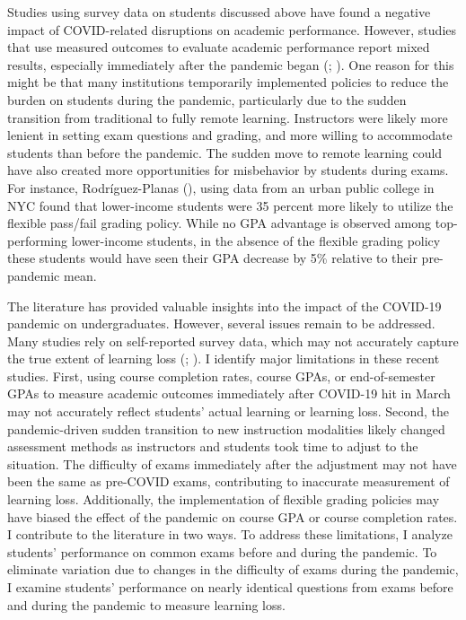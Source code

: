 \documentclass[
  12pt,
  letterpaper,
  DIV=11,
  numbers=noendperiod]{scrartcl}
\begin{document}
Studies using survey data on students discussed above have found a
negative impact of COVID-related disruptions on academic performance.
However, studies that use measured outcomes to evaluate academic
performance report mixed results, especially immediately after the
pandemic began (; ). One reason for this might be that many
institutions temporarily implemented policies to reduce the burden on
students during the pandemic, particularly due to the sudden transition
from traditional to fully remote learning. Instructors were likely more
lenient in setting exam questions and grading, and more willing to
accommodate students than before the pandemic. The sudden move to remote
learning could have also created more opportunities for misbehavior by
students during exams. For instance, Rodríguez-Planas
(), using data from
an urban public college in NYC found that lower-income students were 35
percent more likely to utilize the flexible pass/fail grading policy.
While no GPA advantage is observed among top-performing lower-income
students, in the absence of the flexible grading policy these students
would have seen their GPA decrease by 5\% relative to their pre-pandemic
mean.

The literature has provided valuable insights into the impact of the
COVID-19 pandemic on undergraduates. However, several issues remain to
be addressed. Many studies rely on self-reported survey data, which may
not accurately capture the true extent of learning loss
(;
). I
identify major limitations in these recent studies. First, using course
completion rates, course GPAs, or end-of-semester GPAs to measure
academic outcomes immediately after COVID-19 hit in March may not
accurately reflect students' actual learning or learning loss. Second,
the pandemic-driven sudden transition to new instruction modalities
likely changed assessment methods as instructors and students took time
to adjust to the situation. The difficulty of exams immediately after
the adjustment may not have been the same as pre-COVID exams,
contributing to inaccurate measurement of learning loss. Additionally,
the implementation of flexible grading policies may have biased the
effect of the pandemic on course GPA or course completion rates. I
contribute to the literature in two ways. To address these limitations,
I analyze students' performance on common exams before and during the
pandemic. To eliminate variation due to changes in the difficulty of
exams during the pandemic, I examine students' performance on nearly
identical questions from exams before and during the pandemic to measure
learning loss.
\end{document}
